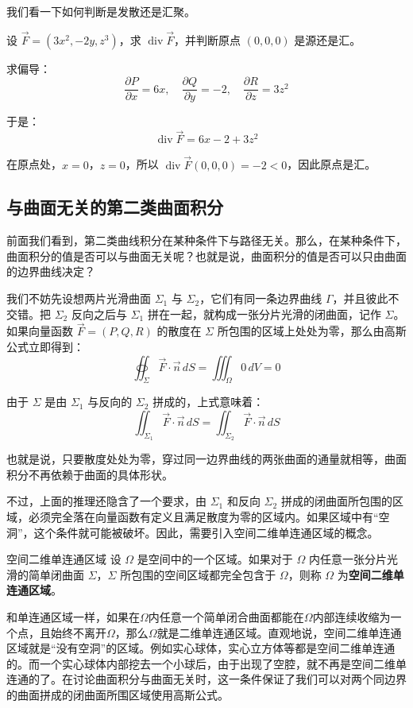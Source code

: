 我们看一下如何判断是发散还是汇聚。
\begin{myexample}
设 \(\vec{F} = (3x^2, -2y, z^3)\)，求 \(\operatorname{div} \vec{F}\)，并判断原点 \((0,0,0)\) 是源还是汇。

求偏导：
\[
\frac{\partial P}{\partial x}=6x,\quad 
\frac{\partial Q}{\partial y}=-2,\quad 
\frac{\partial R}{\partial z}=3z^2
\]

于是：
\[
\operatorname{div} \vec{F} = 6x - 2 + 3z^2
\]

在原点处，\(x=0\)，\(z=0\)，所以 \(\operatorname{div} \vec{F}(0,0,0) = -2 < 0\)，因此原点是汇。
\end{myexample}

\subsection{与曲面无关的第二类曲面积分}

前面我们看到，第二类曲线积分在某种条件下与路径无关。那么，在某种条件下，曲面积分的值是否可以与曲面无关呢？也就是说，曲面积分的值是否可以只由曲面的边界曲线决定？

我们不妨先设想两片光滑曲面 \(\Sigma_1\) 与 \(\Sigma_2\)，它们有同一条边界曲线 \(\Gamma\)，并且彼此不交错。把 \(\Sigma_2\) 反向之后与 \(\Sigma_1\) 拼在一起，就构成一张分片光滑的闭曲面，记作 \(\Sigma\)。如果向量函数 \(\vec{F}=(P,Q,R)\) 的散度在 \(\Sigma\) 所包围的区域上处处为零，那么由高斯公式立即得到：
\[
\oiint_{\Sigma} \vec{F}\cdot\vec{n}\,dS = \iiint_{\Omega} 0\,dV = 0
\]

由于 \(\Sigma\) 是由 \(\Sigma_1\) 与反向的 \(\Sigma_2\) 拼成的，上式意味着：
\[
\iint_{\Sigma_1} \vec{F}\cdot\vec{n}\,dS
=
\iint_{\Sigma_2} \vec{F}\cdot\vec{n}\,dS
\]

也就是说，只要散度处处为零，穿过同一边界曲线的两张曲面的通量就相等，曲面积分不再依赖于曲面的具体形状。

不过，上面的推理还隐含了一个要求，由 \(\Sigma_1\) 和反向 \(\Sigma_2\) 拼成的闭曲面所包围的区域，必须完全落在向量函数有定义且满足散度为零的区域内。如果区域中有“空洞”，这个条件就可能被破坏。因此，需要引入空间二维单连通区域的概念。

\begin{definition}{空间二维单连通区域}{}
设 \(\Omega\) 是空间中的一个区域。如果对于 \(\Omega\) 内任意一张分片光滑的简单闭曲面 \(\Sigma\)，\(\Sigma\) 所包围的空间区域都完全包含于 \(\Omega\)，则称 \(\Omega\) 为\textbf{空间二维单连通区域}。
\end{definition}

和单连通区域一样，如果在\(\Omega\)内任意一个简单闭合曲面都能在\(\Omega\)内部连续收缩为一个点，且始终不离开\(\Omega\)，那么\(\Omega\)就是二维单连通区域。直观地说，空间二维单连通区域就是“没有空洞”的区域。例如实心球体，实心立方体等都是空间二维单连通的。而一个实心球体内部挖去一个小球后，由于出现了空腔，就不再是空间二维单连通的了。在讨论曲面积分与曲面无关时，这一条件保证了我们可以对两个同边界的曲面拼成的闭曲面所围区域使用高斯公式。


